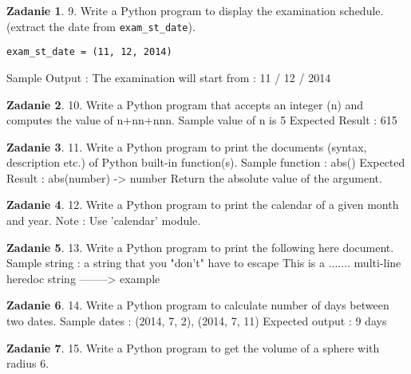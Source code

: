 \documentclass[11pt]{article}
\theoremstyle{definition}
\newtheorem{zadanie}{Zadanie}
\begin{document}
\begin{zadanie}


9. Write a Python program to display the examination schedule. (extract the date from \texttt{exam\_st\_date}).

\begin{verbatim}
exam_st_date = (11, 12, 2014)
\end{verbatim}
Sample Output : The examination will start from : 11 / 12 / 2014

\end{zadanie}

\begin{zadanie}


10. Write a Python program that accepts an integer (n) and computes the value of n+nn+nnn. 
Sample value of n is 5
Expected Result : 615

\end{zadanie}

\begin{zadanie}


11. Write a Python program to print the documents (syntax, description etc.) of Python built-in function(s).
Sample function : abs()
Expected Result :
abs(number) -> number
Return the absolute value of the argument.

\end{zadanie}

\begin{zadanie}


12. Write a Python program to print the calendar of a given month and year.
Note : Use 'calendar' module.

\end{zadanie}

\begin{zadanie}


13. Write a Python program to print the following here document. 
Sample string :
a string that you "don't" have to escape
This
is a ....... multi-line
heredoc string --------> example

\end{zadanie}

\begin{zadanie}


14. Write a Python program to calculate number of days between two dates.
Sample dates : (2014, 7, 2), (2014, 7, 11)
Expected output : 9 days

\end{zadanie}

\begin{zadanie}


15. Write a Python program to get the volume of a sphere with radius 6.

\end{zadanie}
\end{document}
